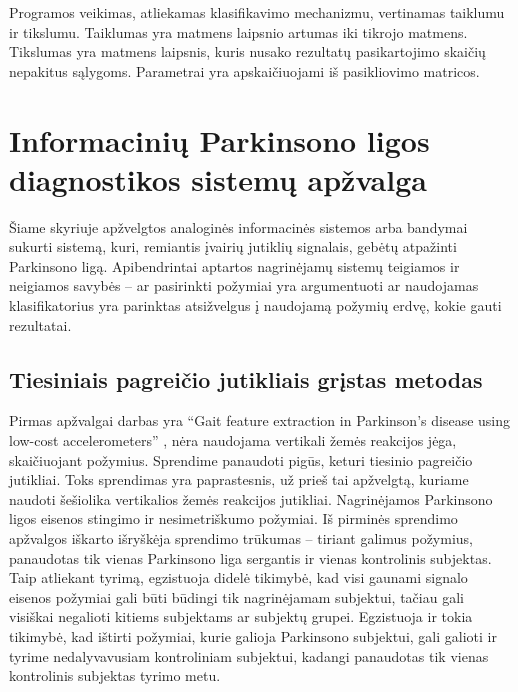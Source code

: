 \documentclass[]{vgtuef}
\begin{document}
Programos veikimas, atliekamas klasifikavimo mechanizmu, vertinamas taiklumu ir tikslumu. Taiklumas yra matmens laipsnio artumas iki tikrojo matmens. Tikslumas yra matmens laipsnis, kuris nusako rezultatų pasikartojimo skaičių nepakitus sąlygoms. Parametrai yra apskaičiuojami iš pasikliovimo matricos.

\section{Informacinių Parkinsono ligos diagnostikos sistemų apžvalga}

Šiame skyriuje apžvelgtos analoginės informacinės sistemos arba bandymai sukurti sistemą, kuri, remiantis įvairių jutiklių signalais, gebėtų atpažinti Parkinsono ligą. Apibendrintai aptartos nagrinėjamų sistemų teigiamos ir neigiamos savybės -- ar pasirinkti požymiai yra argumentuoti ar naudojamas klasifikatorius yra parinktas atsižvelgus į naudojamą požymių erdvę, kokie gauti rezultatai.

\subsection{Tiesiniais pagreičio jutikliais grįstas metodas}


Pirmas apžvalgai darbas yra ``Gait feature extraction in Parkinson's disease using low-cost accelerometers'' \cite{6091948}, nėra naudojama vertikali žemės reakcijos jėga, skaičiuojant požymius. Sprendime panaudoti pigūs, keturi tiesinio pagreičio jutikliai. Toks sprendimas yra paprastesnis, už prieš tai apžvelgtą, kuriame naudoti šešiolika vertikalios žemės reakcijos jutikliai. Nagrinėjamos Parkinsono ligos eisenos stingimo ir nesimetriškumo požymiai. Iš pirminės sprendimo apžvalgos iškarto išryškėja sprendimo trūkumas -- tiriant galimus požymius, panaudotas tik vienas Parkinsono liga sergantis ir vienas kontrolinis subjektas. Taip atliekant tyrimą, egzistuoja didelė tikimybė, kad visi gaunami signalo eisenos požymiai gali būti būdingi tik nagrinėjamam subjektui, tačiau gali visiškai negalioti kitiems subjektams ar subjektų grupei. Egzistuoja ir tokia tikimybė, kad ištirti požymiai, kurie galioja Parkinsono subjektui, gali galioti ir tyrime nedalyvavusiam kontroliniam subjektui, kadangi panaudotas tik vienas kontrolinis subjektas tyrimo metu.
\end{document}
